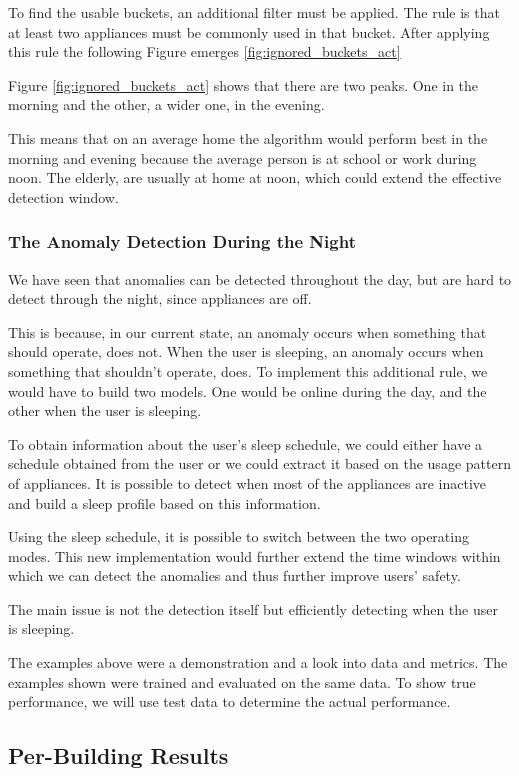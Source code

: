To find the usable buckets, an additional filter must be applied.
The rule is that at least two appliances must be commonly used in that bucket. 
After applying this rule the following Figure emerges \ref{fig:ignored_buckets_act}

Figure \ref{fig:ignored_buckets_act} shows that there are two peaks.
One in the morning and the other, a wider one, in the evening.

This means that on an average home the algorithm would perform best in the morning and evening because the average person is at school or work during noon. 
The elderly, are usually at home at noon, which could extend the effective detection window.


\subsubsection{The Anomaly Detection During the Night}

We have seen that anomalies can be detected throughout the day,
but are hard to detect through the night, since appliances are off.

This is because, in our current state, an anomaly occurs when something that should operate, does not.
When the user is sleeping, an anomaly occurs when something that shouldn't operate, does. 
To implement this additional rule, we would have to build two models.
One would be online during the day, and the other when the user is sleeping.

To obtain information about the user's sleep schedule, we could either have a schedule obtained from the user or we could extract it based on the usage pattern of appliances.
It is possible to detect when most of the appliances are inactive and build a sleep profile based on this information.

Using the sleep schedule, it is possible to switch between the two operating modes. 
This new implementation would further extend the time windows within which we can detect the anomalies and thus further improve users' safety.

The main issue is not the detection itself but efficiently detecting
when the user is sleeping. 

The examples above were a demonstration and a look into data and metrics. 
The examples shown were trained and evaluated on the same data. 
To show true performance, we will use test data to determine the actual performance. 


\subsection{Per-Building Results}
